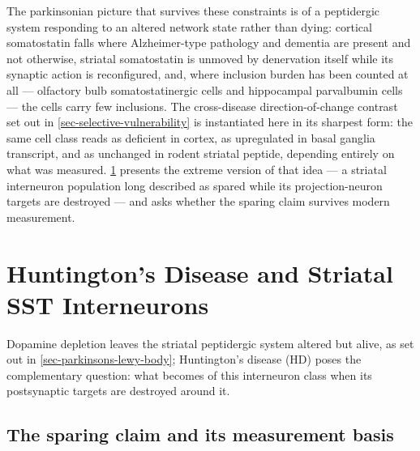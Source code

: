 \documentclass[11pt]{article}
\begin{document}
The parkinsonian picture that survives these constraints is of a peptidergic system responding to an altered network state rather than dying: cortical somatostatin falls where Alzheimer-type pathology and dementia are present and not otherwise, striatal somatostatin is unmoved by denervation itself while its synaptic action is reconfigured, and, where inclusion burden has been counted at all --- olfactory bulb somatostatinergic cells and hippocampal parvalbumin cells --- the cells carry few inclusions. The cross-disease direction-of-change contrast set out in \ref{sec-selective-vulnerability} is instantiated here in its sharpest form: the same cell class reads as deficient in cortex, as upregulated in basal ganglia transcript, and as unchanged in rodent striatal peptide, depending entirely on what was measured. \ref{sec-huntingtons} presents the extreme version of that idea --- a striatal interneuron population long described as spared while its projection-neuron targets are destroyed --- and asks whether the sparing claim survives modern measurement.

\section{Huntington's Disease and Striatal SST Interneurons}
\label{sec-huntingtons}

Dopamine depletion leaves the striatal peptidergic system altered but alive, as set out in \ref{sec-parkinsons-lewy-body}; Huntington's disease (HD) poses the complementary question: what becomes of this interneuron class when its postsynaptic targets are destroyed around it.

\subsection{The sparing claim and its measurement basis}
\label{sec-06-sparing-claim}
\end{document}
